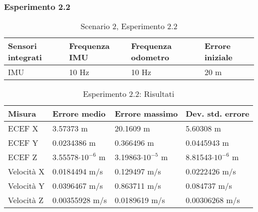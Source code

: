 \subsubsection{Esperimento 2.2}
\begin{table}[h]
	\centering
	\begin{tabular}{|p{3.2cm}|p{2.75cm}|p{2.75cm}|p{2.75cm}|}
		\hline 
		\textbf{Sensori integrati} & \textbf{Frequenza IMU}  & \textbf{Frequenza odometro} & \textbf{Errore iniziale} \\ 
		\hline 
		IMU & 10 Hz & 10 Hz & 20 m\\ 
		\hline 
	\end{tabular}
	\caption{Scenario 2, Esperimento 2.2}
	\label{tab:exp22}
\end{table}
\begin{table}[h]
	\centering
	\begin{tabular}{|p{2cm}|p{3.2cm}|p{3cm}|p{3cm}|}
		\hline 
		\textbf{Misura} 
		& \textbf{Errore medio} 
		& \textbf{Errore massimo}
		& \textbf{Dev. std. errore}\\ 
		\hline 
		ECEF X & 3.57373 m & 20.1609 m & 5.60308 m \\ 
		\hline 
		ECEF Y & 0.0234386 m & 0.366496 m & 0.0445943 m \\ 
		\hline 
		ECEF Z & 3.55578$\cdot10^{-6}$ m & 3.19863$\cdot10^{-5}$ m & 8.81543$\cdot10^{-6}$ m \\ 
		\hline 
		Velocit\`a X & 0.0184494 m/s & 0.129497 m/s & 0.0222426 m/s \\ 
		\hline 
		Velocit\`a Y & 0.0396467 m/s & 0.863711 m/s & 0.084737 m/s \\ 
		\hline 
		Velocit\`a Z & 0.00355928 m/s & 0.0189619 m/s & 0.00306268 m/s \\ 
		\hline 
	\end{tabular}
	\caption{Esperimento 2.2: Risultati}
	\label{tab:exp22res}
\end{table}\FloatBarrier